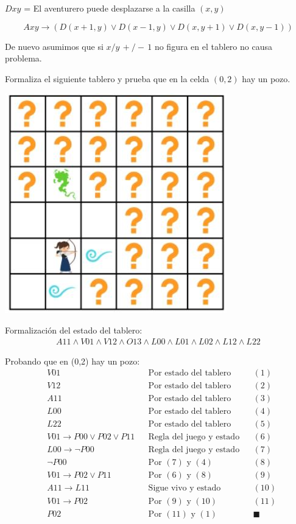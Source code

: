 \documentclass[11pt,letterpaper]{article}
\begin{document}
\begin{enumerate}
\begin{enumerate}
    $Dxy$ = El aventurero puede desplazarse a la casilla $(x, y)$

    $$Axy \rightarrow (D(x+1, y)\lor D(x-1, y)\lor D(x, y+1)\lor
    D(x, y-1))$$
    
    De nuevo asumimos que si $x/y\, +/-\, 1$ no figura en el tablero no causa
    problema.
  \end{enumerate}

  Formaliza el siguiente tablero y prueba que en la celda $(0,2)$ hay un pozo.
  
  \begin{center}
    \includegraphics[scale=0.3]{wumpus2}
  \end{center}

  Formalización del estado del tablero:
  \begin{align*}
    A11 \land V01\land V12\land O13\land L00\land L01\land L02 \land L12
    \land L22
  \end{align*}

  Probando que en (0,2) hay un pozo:
  \begin{align*}
    &V01 & &\text{Por estado del tablero} & &(1)\\
    &V12 & &\text{Por estado del tablero} & &(2)\\
    &A11 & &\text{Por estado del tablero} & &(3)\\
    &L00 & &\text{Por estado del tablero} & &(4)\\
    &L22 & &\text{Por estado del tablero} & &(5)\\
    &V01 \rightarrow P00\lor P02 \lor P11 & &\text{Regla del juego y estado}
    & &(6)\\
    &L00 \rightarrow \neg P00 & &\text{Regla del juego y estado}  & &(7)\\
    &\neg P00 & &\text{Por $(7)$ y $(4)$} & &(8)\\
    &V01 \rightarrow P02 \lor P11 & &\text{Por $(6)$ y $(8)$}  & &(9)\\
    &A11 \rightarrow L11 & &\text{Sigue vivo y estado} & &(10)\\
    &V01 \rightarrow P02 & &\text{Por $(9)$ y $(10)$}  & &(11)\\
    &P02 & &\text{Por $(11)$ y $(1)$} & &\blacksquare
  \end{align*}


\end{enumerate}
\end{document}
